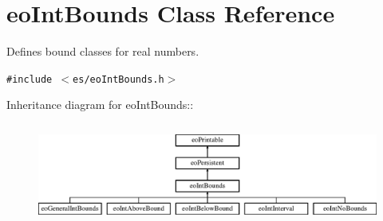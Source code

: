 \section{eo\-Int\-Bounds Class Reference}
\label{classeo_int_bounds}
Defines bound classes for real numbers.  


{\tt \#include $<$es/eo\-Int\-Bounds.h$>$}

Inheritance diagram for eo\-Int\-Bounds::\begin{figure}[H]
\begin{center}
\leavevmode
\includegraphics[height=3.34328cm]{classeo_int_bounds}
\end{center}
\end{figure}
